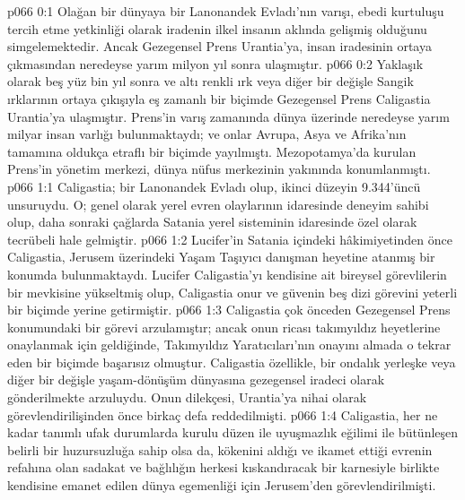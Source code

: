 \vs p066 0:1 Olağan bir dünyaya bir Lanonandek Evladı’nın varışı, ebedi kurtuluşu tercih etme yetkinliği olarak iradenin ilkel insanın aklında gelişmiş olduğunu simgelemektedir. Ancak Gezegensel Prens Urantia’ya, insan iradesinin ortaya çıkmasından neredeyse yarım milyon yıl sonra ulaşmıştır.
\vs p066 0:2 Yaklaşık olarak beş yüz bin yıl sonra ve altı renkli ırk veya diğer bir değişle Sangik ırklarının ortaya çıkışıyla eş zamanlı bir biçimde Gezegensel Prens Caligastia Urantia’ya ulaşmıştır. Prens’in varış zamanında dünya üzerinde neredeyse yarım milyar insan varlığı bulunmaktaydı; ve onlar Avrupa, Asya ve Afrika’nın tamamına oldukça etraflı bir biçimde yayılmıştı. Mezopotamya’da kurulan Prens’in yönetim merkezi, dünya nüfus merkezinin yakınında konumlanmıştı.
\vs p066 1:1 Caligastia; bir Lanonandek Evladı olup, ikinci düzeyin 9.344’üncü unsuruydu. O; genel olarak yerel evren olaylarının idaresinde deneyim sahibi olup, daha sonraki çağlarda Satania yerel sisteminin idaresinde özel olarak tecrübeli hale gelmiştir.
\vs p066 1:2 Lucifer’in Satania içindeki hâkimiyetinden önce Caligastia, Jerusem üzerindeki Yaşam Taşıyıcı danışman heyetine atanmış bir konumda bulunmaktaydı. Lucifer Caligastia’yı kendisine ait bireysel görevlilerin bir mevkisine yükseltmiş olup, Caligastia onur ve güvenin beş dizi görevini yeterli bir biçimde yerine getirmiştir.
\vs p066 1:3 Caligastia çok önceden Gezegensel Prens konumundaki bir görevi arzulamıştır; ancak onun ricası takımyıldız heyetlerine onaylanmak için geldiğinde, Takımyıldız Yaratıcıları’nın onayını almada o tekrar eden bir biçimde başarısız olmuştur. Caligastia özellikle, bir ondalık yerleşke veya diğer bir değişle yaşam\hyp{}dönüşüm dünyasına gezegensel iradeci olarak gönderilmekte arzuluydu. Onun dilekçesi, Urantia’ya nihai olarak görevlendirilişinden önce birkaç defa reddedilmişti.
\vs p066 1:4 Caligastia, her ne kadar tanımlı ufak durumlarda kurulu düzen ile uyuşmazlık eğilimi ile bütünleşen belirli bir huzursuzluğa sahip olsa da, kökenini aldığı ve ikamet ettiği evrenin refahına olan sadakat ve bağlılığın herkesi kıskandıracak bir karnesiyle birlikte kendisine emanet edilen dünya egemenliği için Jerusem’den görevlendirilmişti.
